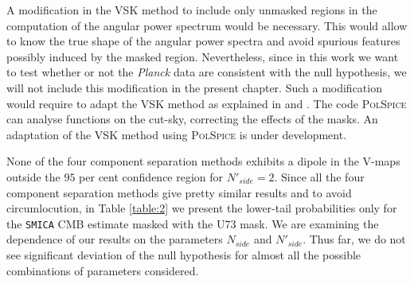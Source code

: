 A modification in the VSK method to include only unmasked regions in the computation of the angular power spectrum would be necessary. This would allow to know the true shape of the angular power spectra and avoid spurious features possibly induced by the masked region. Nevertheless, since in this work we want to test whether or not the \textit{Planck} data are consistent with the null hypothesis, we will not include  this modification in the present chapter. Such a modification would require to adapt the VSK method as explained in \cite{Gorski:1994ye} and \cite{Hivon:2001jp}. The code \textsc{PolSpice} can analyse functions on the cut-sky, correcting the effects of the masks. An adaptation of the VSK method using \textsc{PolSpice} is under development. 

None of the four component separation methods exhibits a dipole in the V-maps outside the $95$ per cent confidence region for $N'_{side}=2$. %
Since all the four component separation methods give pretty similar results and to avoid circumlocution, in Table \ref{table:2} we present the lower-tail probabilities only for the \texttt{SMICA} CMB estimate masked with the U73 mask. We are examining the dependence of our results on the parameters $N_{side}$ and $N'_{side}$. Thus far, we do not see significant deviation of the null hypothesis for almost all the possible combinations of parameters considered.%
 

